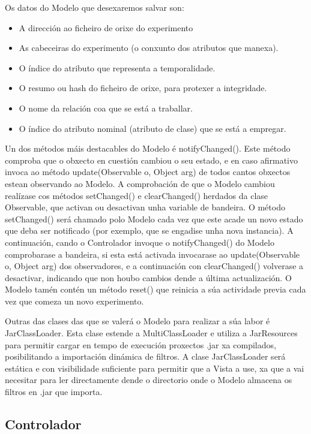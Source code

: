 Os datos do Modelo que desexaremos salvar son:

\begin{itemize}
\item A dirección ao ficheiro de orixe do experimento
\item As cabeceiras do experimento (o conxunto dos atributos que manexa).
\item O índice do atributo que representa a temporalidade.
\item O resumo ou hash do ficheiro de orixe, para protexer a integridade.
\item O nome da relación coa que se está a traballar.
\item O índice do atributo nominal (atributo de clase) que se está a empregar.
\end{itemize}

Un dos métodos máis destacables do Modelo é notifyChanged(). Este método comproba que o obxecto en cuestión cambiou o seu estado, e en caso afirmativo invoca ao método update(Observable o, Object arg) de todos cantos obxectos estean observando ao Modelo. A comprobación de que o Modelo cambiou realízase cos métodos setChanged() e clearChanged() herdados da clase Observable, que activan ou desactivan unha variable de bandeira. O método setChanged() será chamado polo Modelo cada vez que este acade un novo estado que deba ser notificado (por exemplo, que se engadise unha nova instancia). A continuación, cando o Controlador invoque o notifyChanged() do Modelo comprobarase a bandeira, si esta está activada invocarase ao update(Observable o, Object arg) dos observadores, e a continuación con clearChanged() volverase a desactivar, indicando que non houbo cambios dende a última actualización. O Modelo tamén contén un método reset() que reinicia a súa actividade previa cada vez que comeza un novo experimento.

Outras das clases das que se valerá o Modelo para realizar a súa labor é JarClassLoader. Esta clase estende a MultiClassLoader e utiliza a JarResources para permitir cargar en tempo de execución proxectos .jar xa compilados, posibilitando a importación dinámica de filtros. A clase JarClassLoader será estática e con visibilidade suficiente para permitir que a Vista a use, xa que a vai necesitar para ler directamente dende o directorio onde o Modelo almacena os filtros en .jar que importa.

\subsection{Controlador}

